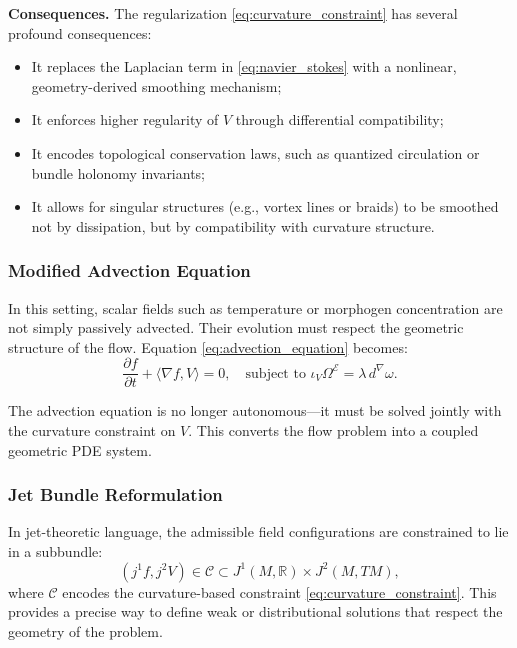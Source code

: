 \textbf{Consequences.} The regularization \eqref{eq:curvature_constraint} has several profound consequences:
\begin{itemize}
  \item It replaces the Laplacian term in \eqref{eq:navier_stokes} with a nonlinear, geometry-derived smoothing mechanism;
  \item It enforces higher regularity of $V$ through differential compatibility;
  \item It encodes topological conservation laws, such as quantized circulation or bundle holonomy invariants;
  \item It allows for singular structures (e.g., vortex lines or braids) to be smoothed not by dissipation, but by compatibility with curvature structure.
\end{itemize}

\subsubsection{Modified Advection Equation} In this setting, scalar fields such as temperature or morphogen concentration are not simply passively advected. Their evolution must respect the geometric structure of the flow. Equation \eqref{eq:advection_equation} becomes:
\begin{equation}
\label{eq:advection_curved}
\frac{\partial f}{\partial t} + \langle \nabla f, V \rangle = 0, \quad \text{subject to } \iota_V \Omega^\mathcal{E} = \lambda \, d^\nabla \omega.
\end{equation}

The advection equation is no longer autonomous—it must be solved jointly with the curvature constraint on $V$. This converts the flow problem into a coupled geometric PDE system.

\subsubsection{Jet Bundle Reformulation} In jet-theoretic language, the admissible field configurations are constrained to lie in a subbundle:
\begin{equation}
\label{eq:jet_bundle_constraint}
(j^1 f, j^2 V) \in \mathcal{C} \subset J^1(M, \mathbb{R}) \times J^2(M, TM),
\end{equation}
where $\mathcal{C}$ encodes the curvature-based constraint \eqref{eq:curvature_constraint}. This provides a precise way to define weak or distributional solutions that respect the geometry of the problem.

